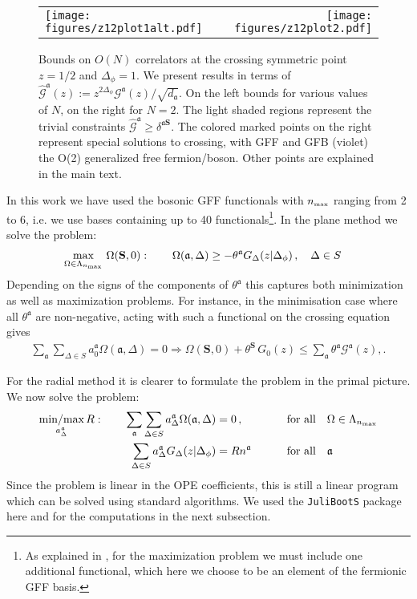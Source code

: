 \documentclass[12pt]{article}
\numberwithin{equation}{section}
\newcommand{\ba}{\begin{equation}\begin{aligned}}
\newcommand{\ea}{\end{aligned}\end{equation}}
\newcommand{\mbf}{\mathbf}
\newcommand{\Df}{{\Delta_\phi}}
\newcommand{\mf}[1]{\mathfrak #1}
\begin{document}
	
\begin{figure}
		\centering
		\begin{tabular}{lr}
				\texttt{[image: figures/z12plot1alt.pdf]}	
		&
		\texttt{[image: figures/z12plot2.pdf]}	
		\end{tabular}
		\caption{\label{fig:2d}Bounds on $O(N)$ correlators at the crossing symmetric point $z=1/2$ and $\Df=1$. We present results in terms of $\hat {\mathcal G}^{\mf a}(z):=z^{2\Df} \mathcal G^{\mf a}(z)/\sqrt{d_{\mf a}}$. On the left bounds for various values of $N$, on the right for $N=2$. The light shaded regions represent the trivial constraints $\hat{\mathcal G}^{\mf a}\geq \delta^{\mf a \mbf S}$. The colored marked points on the right represent special solutions to crossing, with GFF and GFB (violet) the O(2) generalized free fermion/boson. Other points are explained in the main text.
	}
	\end{figure}	
	
	
	
	In this work we have used the bosonic GFF functionals with $n_{\mbox{\tiny max}}$ ranging from 2 to 6, i.e. we use bases containing up to 40 functionals\footnote{As explained in \cite{Paulos:2020zxx}, for the maximization problem we must include one additional functional, which here we choose to be an element of the fermionic GFF basis.}.
	In the plane method we solve the problem:
	\ba
	\underset{\Omega\in \Lambda_{ n_{\mbox{\tiny max}}}}{\mbox{max}}\ \Omega(\mbf S,0): \qquad \Omega(\mf a,\Delta)&\geq -\theta^{\mf a} G_{\Delta}(z|\Df)\,, \quad \Delta\in S
	\ea
	Depending on the signs of the components of $\theta^{\mf a}$ this captures both minimization as well as maximization problems. For instance, in the minimisation case where all $\theta^{\mf a}$ are non-negative, acting with such a functional on the crossing equation gives
	\ba
	\sum_{\mf a}\sum_{\Delta \in S}a_0^{\mf a}\Omega(\mf a,\Delta)=0 \Rightarrow \Omega(\mbf S,0)+\theta^{\mbf S}\,G_0(z) \leq \sum_{\mf a} \theta^{\mf a} \mathcal G^{\mf a}(z),.
	\ea
	
	For the radial method it is clearer to formulate the problem in the primal picture. We now solve the problem:
	\ba
	\underset{a_{\Delta}^{\mf a}}{\mbox{min/max}}\, R: \qquad \sum_{\mf a}\sum_{\Delta\in S} a_\Delta^{\mf a} \Omega(\mf a,\Delta)&=0\,,& \qquad \mbox{for all}&\quad \Omega \in \Lambda_{n_{\mbox{\tiny max}}}\\
	\sum_{\Delta \in S} a_\Delta^{\mf a} G_{\Delta}(z|\Df)&=R n^{\mf a}\,& \quad \mbox{for all}&\quad \mf a
	\ea
	Since the problem is linear in the OPE coefficients, this is still a linear program which can be solved using standard algorithms. We used the \texttt{JuliBootS} package \cite{Paulos:2014vya} here and for the computations in the next subsection.
	
\end{document}
